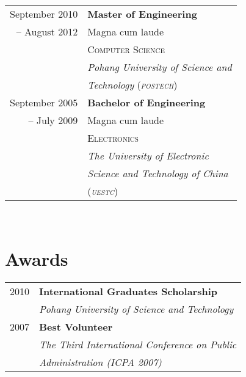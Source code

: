 \documentclass[10pt]{article} %
\begin{document}
{\begin{minipage}[t]{0.44\textwidth}
\begin{tabular}{rl}

September 2010 & \textbf{Master of Engineering} \\ 
-- August 2012 & \small Magna cum laude \\
& \textsc{Computer Science} \\ 
& \textit{Pohang University of Science and}\\
& \textit{Technology} (\textit{\textsc{postech}})\\
	 

September 2005 & \textbf{Bachelor of Engineering} \\ 
-- July 2009 & \small Magna cum laude \\
& \textsc{Electronics} \\ 
& \textit{The University of Electronic}\\
& \textit{Science and Technology of China}\\
& (\textit{\textsc{uestc}})


\end{tabular}\\[10pt]


\section{Awards} 

\begin{tabular}{rl}
2010	 & \textbf{International Graduates Scholarship}\\
& \textit{Pohang University of Science and Technology}\\


2007	 & \textbf{Best Volunteer}\\
& \textit{The Third International Conference on Public}\\
& \textit{Administration (ICPA 2007)}\\ 


\end{tabular}
\end{minipage}}
\end{document}
